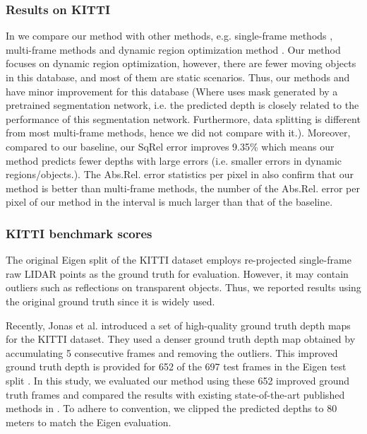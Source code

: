 \documentclass[journal]{IEEEtran}
\begin{document}
\subsubsection{Results on KITTI}
In  we compare our method with other methods, e.g. single-frame methods \cite{monodepth2,guizilini20203d,casser2019}, multi-frame methods \cite{manydepth,wang2020self,patil2020don} and dynamic region optimization method \cite{lee2021attentive}. Our method focuses on dynamic region optimization, however, there are fewer moving objects in this database, and most of them are static scenarios. Thus, our methods and \cite{casser2019,lee2021learning,lee2021attentive,gao2020attentional,gordon2019depth,li2020unsupervised,feng2022disentangling} have minor improvement for this database (Where \cite{feng2022disentangling} uses mask generated by a pretrained segmentation network, i.e. the predicted depth is closely related to the performance of this segmentation network. Furthermore, data splitting is different from most multi-frame methods, hence we did not compare with it.). Moreover, compared to our baseline, our SqRel error improves 9.35\% which means our method predicts fewer depths with large errors (i.e. smaller errors in dynamic regions/objects.). The Abs.Rel. error statistics per pixel in  also confirm that our method is better than multi-frame methods, the number of the Abs.Rel. error per pixel of our method in the interval  is much larger than that of the baseline.

\subsubsection{KITTI benchmark scores}
The original Eigen \cite{eigen2015predicting} split of the KITTI \cite{menze2015object} dataset employs re-projected single-frame raw LIDAR points as the ground truth for evaluation. However, it may contain outliers such as reflections on transparent objects. Thus, we reported results using the original ground truth since it is widely used.

Recently, Jonas et al. \cite{uhrig2017sparsity} introduced a set of high-quality ground truth depth maps for the KITTI dataset. They used a denser ground truth depth map obtained by accumulating 5 consecutive frames and removing the outliers. This improved ground truth depth is provided for 652 of the 697 test frames in the Eigen test split \cite{eigen2015predicting}. In this study, we evaluated our method using these 652 improved ground truth frames and compared the results with existing state-of-the-art published methods in . To adhere to convention, we clipped the predicted depths to 80 meters to match the Eigen evaluation.
\end{document}
